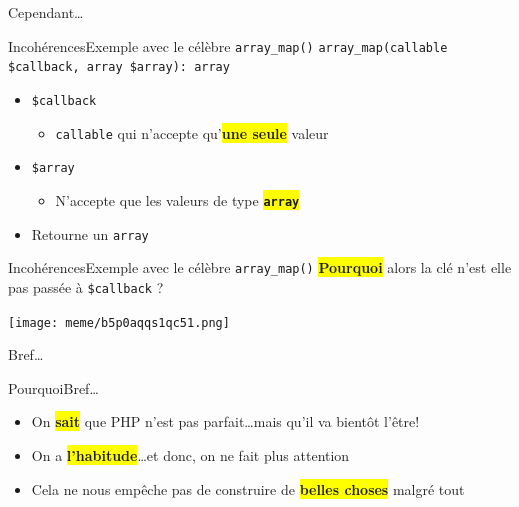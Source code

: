 \begin{frameC}{Cependant\ldots}

\end{frameC}

\begin{frame}{Incohérences}{Exemple avec le célèbre \texttt{array\_map()}}
    \texttt{array\_map(callable \$callback, array \$array): array}

    \pause

    \begin{itemize}[<+->]
        \item \texttt{\$callback}

        \begin{itemize}[<+->]
            \item \texttt{callable} qui n'accepte qu'\colorbox{yellow}{\textbf{une seule}} valeur
        \end{itemize}

        \item \texttt{\$array}

        \begin{itemize}[<+->]
            \item N'accepte que les valeurs de type \colorbox{yellow}{\texttt{\textbf{array}}}
        \end{itemize}

        \item Retourne un \texttt{array}
    \end{itemize}

\end{frame}

\begin{frame}{Incohérences}{Exemple avec le célèbre \texttt{array\_map()}}
    \colorbox{yellow}{\textbf{Pourquoi}} alors la clé n'est elle pas passée à \texttt{\$callback} ?

    \begin{center}
        \texttt{[image: meme/b5p0aqqs1qc51.png]}
    \end{center}
\end{frame}

\begin{frameC}{Bref\ldots}

\end{frameC}

\begin{frame}{Pourquoi}{Bref\ldots}
    \begin{itemize}[<+->]
        \item On \colorbox{yellow}{\textbf{sait}} que PHP n'est pas parfait\ldots \pause[\thebeamerpauses] mais qu'il va bientôt l'être!\pause
        \item On a \colorbox{yellow}{\textbf{l'habitude}}\ldots \pause[\thebeamerpauses] et donc, on ne fait plus attention\pause
        \item Cela ne nous empêche pas de construire de \colorbox{yellow}{\textbf{belles choses}} malgré tout
    \end{itemize}
\end{frame}
